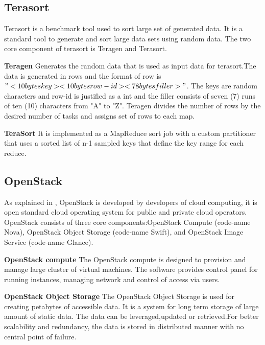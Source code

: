 
\subsection{Terasort}
Terasort is a benchmark tool used to sort large set of generated data. It is a standard tool to generate and sort large data sets using random data. The two core component of terasort is Teragen and Terasort. 

\textbf{Teragen}  Generates the random data that is used as input data for terasort.The data is generated in rows and the format of row is $"<10 bytes key><10 bytes row-id><78 bytes filler>"$. 
The keys are random characters and row-id is justified as a int and the filler consists of seven (7) runs of ten (10) characters from "A" to "Z". Teragen divides the number of rows by the desired number of tasks and assigns set of rows to each map.

\textbf{TeraSort} It is implemented as a MapReduce sort job with a custom partitioner that uses a sorted list of n-1 sampled keys that define the key range for each reduce.







\subsection{OpenStack}

As explained in \cite{openstack}, OpenStack is developed by developers of cloud computing, it is open standard cloud operating system for public and private cloud operators. OpenStack consists of three core components:OpenStack Compute (code-name Nova), OpenStack Object Storage (code-name Swift), and OpenStack Image Service (code-name Glance).


\textbf{OpenStack compute } The OpenStack compute is designed to provision and manage large cluster of virtual machines. The software provides control panel for running instances, managing network and control of access via users.
 
\textbf{OpenStack Object Storage } The OpenStack Object Storage is used for creating petabytes of accessible data. It is a system for long term storage of large amount of static data. The data can be leveraged,updated or retrieved.For better scalability and redundancy, the data is stored in distributed manner with no central point of failure.

